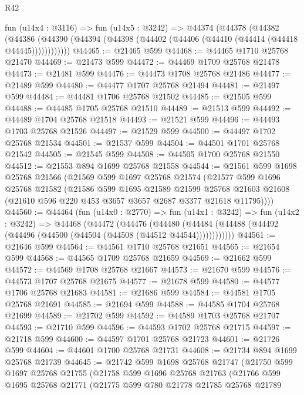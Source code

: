 \begin{lexlean}{R42}
\begin{coremodule}
    fun (u14x4 : @3116) =>
    fun (u14x5 : @3242) =>
    @44374
      (@44378
        (@44382
          (@44386 (@44390 (@44394 (@44398 (@44402 (@44406 (@44410 (@44414 (@44418 @44445))))))))))))
@44465 := @21465 @599
@44468 := @44465 @1710 @25768 @21470
@44469 := @21473 @599
@44472 := @44469 @1709 @25768 @21478
@44473 := @21481 @599
@44476 := @44473 @1708 @25768 @21486
@44477 := @21489 @599
@44480 := @44477 @1707 @25768 @21494
@44481 := @21497 @599
@44484 := @44481 @1706 @25768 @21502
@44485 := @21505 @599
@44488 := @44485 @1705 @25768 @21510
@44489 := @21513 @599
@44492 := @44489 @1704 @25768 @21518
@44493 := @21521 @599
@44496 := @44493 @1703 @25768 @21526
@44497 := @21529 @599
@44500 := @44497 @1702 @25768 @21534
@44501 := @21537 @599
@44504 := @44501 @1701 @25768 @21542
@44505 := @21545 @599
@44508 := @44505 @1700 @25768 @21550
@44512 := @21553 @894 @1699 @25768 @21558
@44544 := @21561
    @599
    @1698
    @25768
    @21566
    (@21569
      @599
      @1697
      @25768
      @21574
      (@21577
        @599
        @1696
        @25768
        @21582
        (@21586
          @599
          @1695
          @21589
          @21599
          @25768
          @21603
          @21608
          (@21610 @596 @220 @453 @3657 @3657 @2687 @3377 @21618 @11795))))
@44560 := @44464
    (fun (u14x0 : @2770) =>
    fun (u14x1 : @3242) =>
    fun (u14x2 : @3242) =>
    @44468
      (@44472
        (@44476
          (@44480 (@44484 (@44488 (@44492 (@44496 (@44500 (@44504 (@44508 (@44512 @44544))))))))))))
@44561 := @21646 @599
@44564 := @44561 @1710 @25768 @21651
@44565 := @21654 @599
@44568 := @44565 @1709 @25768 @21659
@44569 := @21662 @599
@44572 := @44569 @1708 @25768 @21667
@44573 := @21670 @599
@44576 := @44573 @1707 @25768 @21675
@44577 := @21678 @599
@44580 := @44577 @1706 @25768 @21683
@44581 := @21686 @599
@44584 := @44581 @1705 @25768 @21691
@44585 := @21694 @599
@44588 := @44585 @1704 @25768 @21699
@44589 := @21702 @599
@44592 := @44589 @1703 @25768 @21707
@44593 := @21710 @599
@44596 := @44593 @1702 @25768 @21715
@44597 := @21718 @599
@44600 := @44597 @1701 @25768 @21723
@44601 := @21726 @599
@44604 := @44601 @1700 @25768 @21731
@44608 := @21734 @894 @1699 @25768 @21739
@44645 := @21742
    @599
    @1698
    @25768
    @21747
    (@21750
      @599
      @1697
      @25768
      @21755
      (@21758
        @599
        @1696
        @25768
        @21763
        (@21766
          @599
          @1695
          @25768
          @21771
          (@21775
            @599
            @780
            @21778
            @21785
            @25768
            @21789

\end{coremodule}
\end{lexlean}
